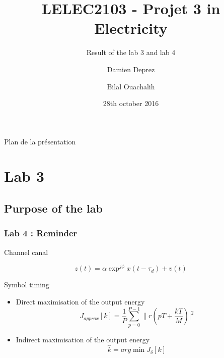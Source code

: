 \documentclass[11pt]{beamer}
\title{LELEC2103 - Projet 3 in Electricity}
\subtitle[\ldots]{Result of the lab 3 and lab 4}
\author[D. Deprez\and B. Ouachalih]{Damien Deprez\and Bilal Ouachalih}
\institute{EPL}
\date{28th october 2016}
\begin{document}
{
	\begin{frame}[noframenumbering]
		\titlepage
	\end{frame}
} 

{
	\begin{frame}[noframenumbering]{Plan de la présentation}
		\tableofcontents
	\end{frame}
}

\section{Lab 3}
\subsection{Purpose of the lab}
\begin{frame}
\frametitle{Lab 4 : Reminder}

Channel canal

\begin{equation}
z(t)=\alpha\exp^{j\phi} x(t-\tau_{d})+v(t)
\label{equ1}
\end{equation}

Symbol timing

\begin{itemize}

\item Direct maximisation of the output energy
\begin{equation}
J_{approx}[k] = \frac{1}{P} \sum \limits_{p=0}^{P-1} \|r(pT+\frac{kT}{M})|^2
\end{equation}

\item Indirect maximisation of the output energy
\begin{equation}
\hat{k}= arg\min J_{\delta}[k]
\end{equation}

\end{itemize}

\end{frame}
\end{document}
